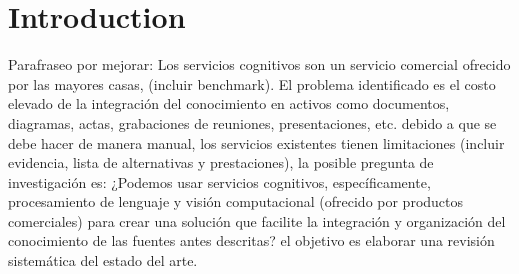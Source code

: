 \section{Introduction}
Parafraseo por mejorar: Los servicios cognitivos son un servicio comercial ofrecido por las mayores casas, (incluir benchmark). El problema identificado es el costo elevado de la integración del conocimiento en activos como documentos, diagramas, actas, grabaciones de reuniones, presentaciones, etc. debido a que se debe hacer de manera manual, los servicios existentes tienen limitaciones (incluir evidencia, lista de alternativas y prestaciones), la posible pregunta de investigación es: ¿Podemos usar servicios cognitivos, específicamente, procesamiento de lenguaje y visión computacional (ofrecido por productos comerciales) para crear una solución que facilite la integración y organización del conocimiento de las fuentes antes descritas? el objetivo es elaborar una revisión sistemática del estado del arte.